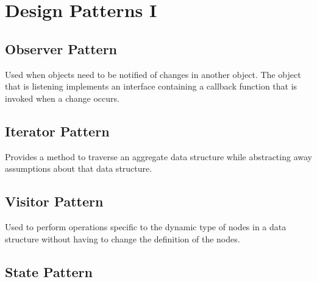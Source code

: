 
\chapter{Design Patterns I}


\section{Observer Pattern}

Used when objects need to be notified of changes in
another object. The object that is listening implements an
interface containing a callback function that is invoked when
a change occurs.

\section{Iterator Pattern}

Provides a method to traverse an aggregate data
structure while abstracting away assumptions about that
data structure.

\section{Visitor Pattern}

Used to perform operations specific to the dynamic type of
nodes in a data structure without having to change the
definition of the nodes.

\section{State Pattern}